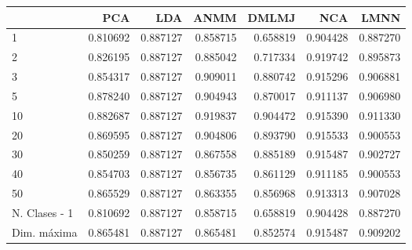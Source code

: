 \begin{tabular}{lrrrrrr}
\toprule
{} &       PCA &       LDA &      ANMM &     DMLMJ &       NCA &      LMNN \\
\midrule
1             &  0.810692 &  0.887127 &  0.858715 &  0.658819 &  0.904428 &  0.887270 \\
2             &  0.826195 &  0.887127 &  0.885042 &  0.717334 &  0.919742 &  0.895873 \\
3             &  0.854317 &  0.887127 &  0.909011 &  0.880742 &  0.915296 &  0.906881 \\
5             &  0.878240 &  0.887127 &  0.904943 &  0.870017 &  0.911137 &  0.906980 \\
10            &  0.882687 &  0.887127 &  0.919837 &  0.904472 &  0.915390 &  0.911330 \\
20            &  0.869595 &  0.887127 &  0.904806 &  0.893790 &  0.915533 &  0.900553 \\
30            &  0.850259 &  0.887127 &  0.867558 &  0.885189 &  0.915487 &  0.902727 \\
40            &  0.854703 &  0.887127 &  0.856735 &  0.861129 &  0.911185 &  0.900553 \\
50            &  0.865529 &  0.887127 &  0.863355 &  0.856968 &  0.913313 &  0.907028 \\
N. Clases - 1 &  0.810692 &  0.887127 &  0.858715 &  0.658819 &  0.904428 &  0.887270 \\
Dim. máxima   &  0.865481 &  0.887127 &  0.865481 &  0.852574 &  0.915487 &  0.909202 \\
\bottomrule
\end{tabular}
